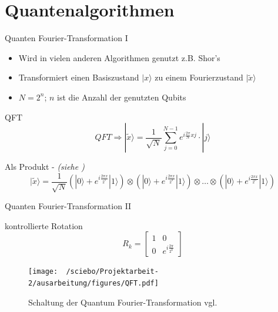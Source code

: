 \documentclass[compress,aspectratio=1610]{beamer}
\begin{document}
\section{Quantenalgorithmen}
\begin{frame}{Quanten Fourier-Transformation I}
  \begin{itemize}
  \item Wird in vielen anderen Algorithmen genutzt z.B. Shor's
  \item Transformiert einen Basiszustand $|x\rangle$ zu einem Fourierzustand $|\tilde{x}\rangle$
  \item $N = 2^n$; $n$ ist die Anzahl der genutzten Qubits
  \end{itemize}
  \begin{block}{QFT}
    $$QFT \Rightarrow |\tilde{x}\rangle = \frac{1}{\sqrt{N}}\sum\limits_{j=0}^{N-1}e^{i\frac{2\pi}{N}xj}\cdot|j\rangle$$
  \end{block}
  \begin{block}{Als Produkt - \textit{(siehe \cite{Qiskit-Textbook})}}
    $$|\tilde{x}\rangle = \frac{1}{\sqrt{N}} \left(|0\rangle + e^{i\frac{2\pi x}{2^1}}|1\rangle\right)\otimes\left(|0\rangle + e^{i\frac{2\pi x}{2^2}}|1\rangle\right)\otimes\dots\otimes\left(|0\rangle + e^{i\frac{2\pi x}{2^n}}|1\rangle\right)$$
  \end{block}
\end{frame}

\begin{frame}{Quanten Fourier-Transformation II}
  \begin{block}{kontrollierte Rotation \cite{Qiskit-Textbook}}
    $$R_k =
    \begin{bmatrix}
      1 & 0 \\
      0 & e^{i\frac{2\pi}{2^k}}
    \end{bmatrix}$$
  \end{block}
  \begin{figure}[h]
    \centering
    \texttt{[image: ~/sciebo/Projektarbeit-2/ausarbeitung/figures/QFT.pdf]}
    \caption{Schaltung der Quantum Fourier-Transformation vgl. \cite{nielsen_chuang_2010}}
  \end{figure}
\end{frame}
\end{document}
